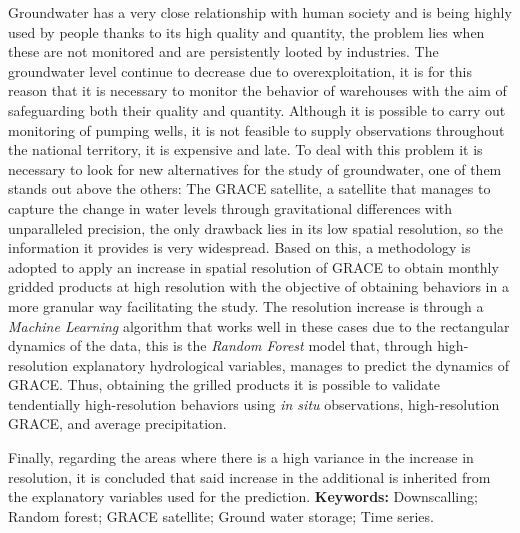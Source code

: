 Groundwater has a very close relationship with human society and is being highly used by people thanks to its
high quality and quantity, the problem lies when these are not monitored and are persistently looted by industries. The groundwater level continue to decrease due to overexploitation, it is for this reason that it is necessary to monitor the behavior of
warehouses with the aim of safeguarding both their quality and quantity. Although it is possible to carry out monitoring of pumping wells, it is not
feasible to supply observations throughout the national territory, it is expensive and late. To deal with this problem it is necessary to look for new alternatives for the study of
groundwater, one of them stands out above the others: The GRACE satellite, a satellite that manages to capture the change in water levels through gravitational differences with unparalleled precision,
the only drawback lies in its low spatial resolution, so the information it provides is very
widespread. Based on this, a methodology is adopted to apply an increase in spatial resolution of GRACE to obtain monthly gridded products at high resolution with the
objective of obtaining behaviors in a more granular way facilitating the study. The resolution increase is through a \textit{Machine Learning} algorithm that works well in these cases
due to the rectangular dynamics of the data, this is the \textit{Random Forest} model that, through high-resolution explanatory hydrological variables, manages to predict
the dynamics of GRACE. Thus, obtaining the grilled products it is possible to validate tendentially
high-resolution behaviors using \textit{in situ} observations, high-resolution GRACE, and average precipitation.

Finally, regarding the areas where there is a high variance in the increase in resolution, it is concluded that said increase in the additional is inherited from the explanatory variables used for the prediction.
\vskip 0.2in
\noindent
{\bf Keywords:} Downscalling; Random forest; GRACE satellite; Ground water storage; Time series.

